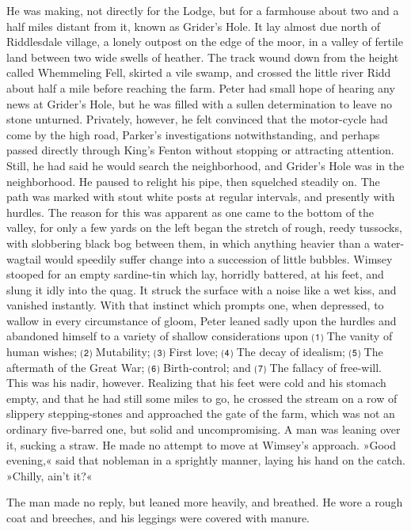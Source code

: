 He was making, not directly for the Lodge, but for a farmhouse about two and a half miles distant from it, known as Grider's Hole. It lay almost due north of Riddlesdale village, a lonely outpost on the edge of the moor, in a valley of fertile land between two wide swells of heather. The track wound down from the height called Whemmeling Fell, skirted a vile swamp, and crossed the little river Ridd about half a mile before reaching the farm. Peter had small hope of hearing any news at Grider's Hole, but he was filled with a sullen determination to leave no stone unturned. Privately, however, he felt convinced that the motor-cycle had come by the high road, Parker's investigations notwithstanding, and perhaps passed directly through King's Fenton without stopping or attracting attention. Still, he had said he would search the neighborhood, and Grider's Hole was in the neighborhood. He paused to relight his pipe, then squelched steadily on. The path was marked with stout white posts at regular intervals, and presently with hurdles. The reason for this was apparent as one came to the bottom of the valley, for only a few yards on the left began the stretch of rough, reedy tussocks, with slobbering black bog between them, in which anything heavier than a water-wagtail would speedily suffer change into a succession of little bubbles. Wimsey stooped for an empty sardine-tin which lay, horridly battered, at his feet, and slung it idly into the quag. It struck the surface with a noise like a wet kiss, and vanished instantly. With that instinct which prompts one, when depressed, to wallow in every circumstance of gloom, Peter leaned sadly upon the hurdles and abandoned himself to a variety of shallow considerations upon ⑴ The vanity of human wishes; ⑵ Mutability; ⑶ First love; ⑷ The decay of idealism; ⑸ The aftermath of the Great War; ⑹ Birth-control; and ⑺ The fallacy of free-will. This was his nadir, however. Realizing that his feet were cold and his stomach empty, and that he had still some miles to go, he crossed the stream on a row of slippery stepping-stones and approached the gate of the farm, which was not an ordinary five-barred one, but solid and uncompromising. A man was leaning over it, sucking a straw. He made no attempt to move at Wimsey's approach. »Good evening,« said that nobleman in a sprightly manner, laying his hand on the catch. »Chilly, ain't it?«

The man made no reply, but leaned more heavily, and breathed. He wore a rough coat and breeches, and his leggings were covered with manure.

